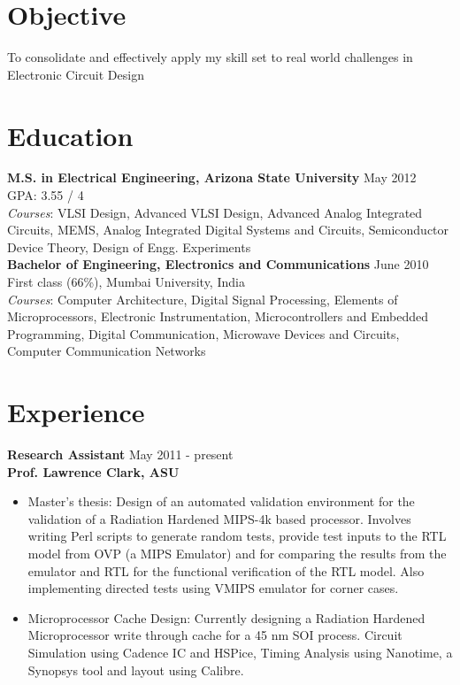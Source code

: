 \documentclass[margin]{res}
\begin{document}

\address{ \textit{email}: ssridh14@asu.edu\\ \textit{phone}:  +1 (480) 327-7224}

\begin{resume} 

\section{Objective}
To consolidate and effectively apply my skill set to real world challenges in Electronic Circuit Design

\section{Education}
{\bf M.S. in Electrical Engineering, Arizona State University} \hfill  May 2012\\
GPA: 3.55 / 4\\
\textit{Courses}: VLSI Design, Advanced VLSI Design, Advanced Analog Integrated Circuits, MEMS, Analog Integrated Digital Systems and Circuits, Semiconductor Device Theory, Design of Engg. Experiments\\

\vspace{-0.2in}
{\bf Bachelor of Engineering, Electronics and Communications}  \hfill June 2010\\
First class (66\%), Mumbai University, India\\
\textit{Courses}: Computer Architecture, Digital Signal Processing, Elements of Microprocessors, Electronic Instrumentation, Microcontrollers and Embedded Programming, Digital Communication, Microwave Devices and Circuits, Computer Communication Networks

\section{Experience}
{\bf Research Assistant} \hfill May 2011 - present\\
{\bf Prof. Lawrence Clark, ASU}
\begin{itemize}
	\item Master’s thesis: Design of an automated validation environment for the validation of a Radiation Hardened MIPS-4k based processor. Involves writing Perl scripts to generate random tests, provide test inputs to the RTL model from OVP (a MIPS Emulator) and for comparing the results from the emulator and RTL for the functional verification of the RTL model. Also implementing directed tests using VMIPS emulator for corner cases.	
	\item Microprocessor Cache Design: Currently designing a Radiation Hardened Microprocessor write through cache for a 45 nm SOI process. Circuit Simulation using Cadence IC and HSPice, Timing Analysis using Nanotime, a Synopsys tool and layout using Calibre.
\end{itemize} 


\end{resume}
\end{document}
